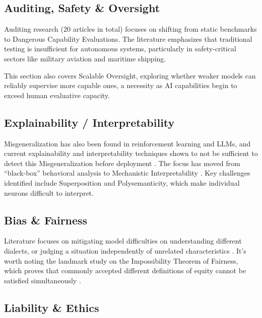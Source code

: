     \subsection{Auditing, Safety \& Oversight}

        Auditing research (20 articles in total) focuses on shifting from static benchmarks to Dangerous Capability Evaluations. The literature emphasizes that traditional testing is insufficient for autonomous systems, particularly in safety-critical sectors like military aviation and maritime shipping. \begin{toreview} This section also covers Scalable Oversight, exploring whether weaker models can reliably supervise more capable ones, a necessity as AI capabilities begin to exceed human evaluative capacity.

    \subsection{Explainability / Interpretability}

        Misgeneralization has also been found in reinforcement learning and LLMs, and current explainability and interpretability techniques shown to not be sufficient to detect this Misgeneralization before deployment \cite{langosco2022goal}. The focus has moved from ``black-box'' behavioral analysis to Mechanistic Interpretability \cite{anthropic2025biology}. Key challenges identified include Superposition and Polysemanticity, which make individual neurons difficult to interpret.

    \subsection{Bias \& Fairness}

        Literature focuses on mitigating model difficulties on understanding different dialects, or judging a situation independently of unrelated characteristics \cite{li_instance-consistent_2025}. It's worth noting the landmark study on the Impossibility Theorem of Fairness, which proves that commonly accepted different definitions of equity cannot be satisfied simultaneously \cite{kleinberg2016inherent}.

\end{toreview}

    \subsection{Liability \& Ethics}


